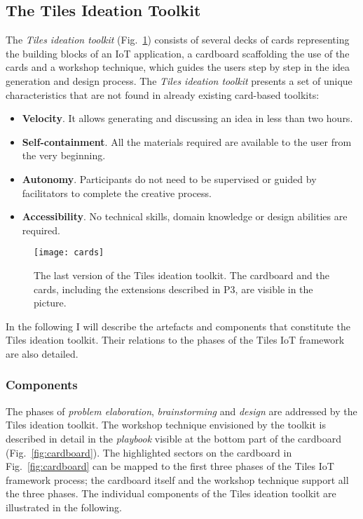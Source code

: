 \subsection{The Tiles Ideation Toolkit}
\label{sec:tiles-toolkit}

The \textit{Tiles ideation toolkit} (Fig.~\ref{fig:tiles-ideation}) consists of several decks of cards representing the building blocks of an IoT application, a cardboard scaffolding the use of the cards and a workshop technique, which guides the users step by step in the idea generation and design process. The \textit{Tiles ideation toolkit} presents a set of unique characteristics that are not found in already existing card-based toolkits:

\begin{itemize}
    \item \textbf{Velocity}. It allows generating and discussing an idea in less than two hours.
    \item \textbf{Self-containment}. All the materials required are available to the user from the very beginning.
    \item \textbf{Autonomy}. Participants do not need to be supervised or guided by facilitators to complete the creative process.
    \item \textbf{Accessibility}. No technical skills, domain knowledge or design abilities are required.
\end{itemize}

\begin{figure}[ptb]
    \centering 
	\texttt{[image: cards]}
	\caption{The last version of the Tiles ideation toolkit. The cardboard and the cards, including the extensions described in P3, are visible in the picture.}
	\label{fig:tiles-ideation}
\end{figure}

In the following I will describe the artefacts and components that constitute the Tiles ideation toolkit. Their relations to the phases of the Tiles IoT framework are also detailed.

\subsubsection{Components}

The phases of \textit{problem elaboration}, \textit{brainstorming} and \textit{design} are addressed by the Tiles ideation toolkit. The workshop technique envisioned by the toolkit is described in detail in the \textit{playbook} visible at the bottom part of the cardboard (Fig.~\ref{fig:cardboard}). The highlighted sectors on the cardboard in Fig.~\ref{fig:cardboard} can be mapped to the first three phases of the Tiles IoT framework process; the cardboard itself and the workshop technique support all the three phases. The individual components of the Tiles ideation toolkit are illustrated in the following.


